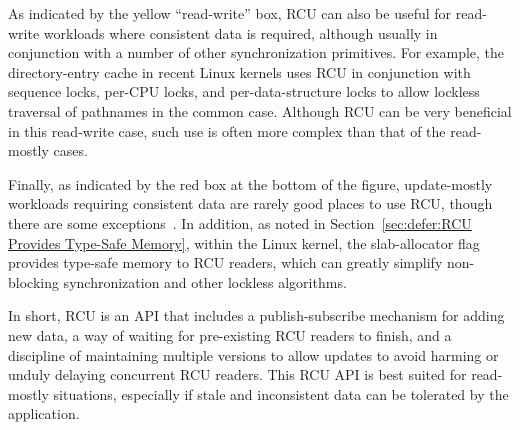As indicated by the yellow ``read-write'' box, RCU can also be useful
for read-write
workloads where consistent data is required, although usually in
conjunction with a number of other synchronization primitives.
For example, the directory-entry cache in recent Linux kernels uses RCU in
conjunction with sequence locks, per-CPU locks, and per-data-structure
locks to allow lockless traversal of pathnames in the common case.
Although RCU can be very beneficial in this read-write case, such
use is often more complex than that of the read-mostly cases.

Finally, as indicated by the red box at the bottom of the figure,
update-mostly workloads requiring
consistent data are rarely good places to use RCU, though there are some
exceptions~\cite{MathieuDesnoyers2012URCU}.
In addition, as noted in
Section~\ref{sec:defer:RCU Provides Type-Safe Memory},
within the Linux kernel, the 
slab-allocator flag provides type-safe memory to RCU readers, which can
greatly simplify non-blocking synchronization and other lockless
algorithms.

In short, RCU is an API that includes a publish-subscribe mechanism for
adding new data, a way of waiting for pre-existing RCU readers to finish,
and a discipline of maintaining multiple versions to allow updates to
avoid harming or unduly delaying concurrent RCU readers.
This RCU API is best suited for read-mostly situations, especially if
stale and inconsistent data can be tolerated by the application.
